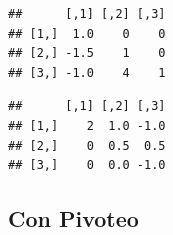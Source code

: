 \documentclass[
]{book}
\newenvironment{Shaded}{\begin{snugshade}}{\end{snugshade}}
\newcommand{\AttributeTok}[1]{\textcolor[rgb]{0.13,0.29,0.53}{#1}}
\newcommand{\ConstantTok}[1]{\textcolor[rgb]{0.56,0.35,0.01}{#1}}
\newcommand{\DecValTok}[1]{\textcolor[rgb]{0.00,0.00,0.81}{#1}}
\newcommand{\FunctionTok}[1]{\textcolor[rgb]{0.13,0.29,0.53}{\textbf{#1}}}
\newcommand{\NormalTok}[1]{#1}
\newcommand{\OtherTok}[1]{\textcolor[rgb]{0.56,0.35,0.01}{#1}}
\newcommand{\SpecialCharTok}[1]{\textcolor[rgb]{0.81,0.36,0.00}{\textbf{#1}}}
\begin{document}
\begin{Shaded}
\end{Shaded}

\begin{verbatim}
##      [,1] [,2] [,3]
## [1,]  1.0    0    0
## [2,] -1.5    1    0
## [3,] -1.0    4    1
\end{verbatim}

\begin{verbatim}
##      [,1] [,2] [,3]
## [1,]    2  1.0 -1.0
## [2,]    0  0.5  0.5
## [3,]    0  0.0 -1.0
\end{verbatim}

\subsection{Con Pivoteo}\label{con-pivoteo}
\end{document}
